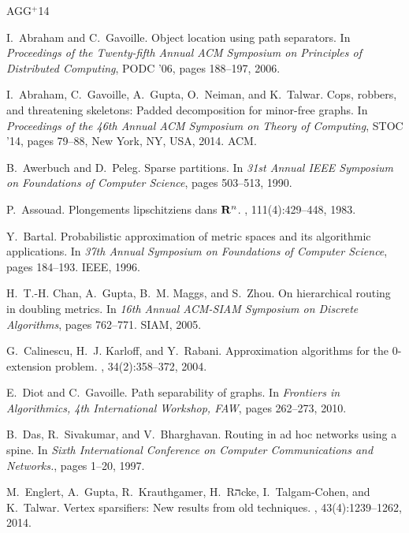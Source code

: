 \documentclass[11pt,fleqn]{article}
\begin{document}
\newcommand{\etalchar}[1]{$^{#1}$}
\begin{thebibliography}{AGG{\etalchar{+}}14}

I.~Abraham and C.~Gavoille.
\newblock Object location using path separators.
\newblock In {\em Proceedings of the Twenty-fifth Annual ACM Symposium on
  Principles of Distributed Computing}, PODC '06, pages 188--197, 2006.

\bibitem[AGG{\etalchar{+}}14]{AGGNT14}
I.~Abraham, C.~Gavoille, A.~Gupta, O.~Neiman, and K.~Talwar.
\newblock Cops, robbers, and threatening skeletons: Padded decomposition for
  minor-free graphs.
\newblock In {\em Proceedings of the 46th Annual ACM Symposium on Theory of
  Computing}, STOC '14, pages 79--88, New York, NY, USA, 2014. ACM.

B.~Awerbuch and D.~Peleg.
\newblock Sparse partitions.
\newblock In {\em 31st Annual IEEE Symposium on Foundations of Computer
  Science}, pages 503--513, 1990.

P.~Assouad.
\newblock Plongements lipschitziens dans {${\bf R}\sp{n}$}.
, 111(4):429--448, 1983.

Y.~Bartal.
\newblock Probabilistic approximation of metric spaces and its algorithmic
  applications.
\newblock In {\em 37th Annual Symposium on Foundations of Computer Science},
  pages 184--193. IEEE, 1996.

H.~T.-H. Chan, A.~Gupta, B.~M. Maggs, and S.~Zhou.
\newblock On hierarchical routing in doubling metrics.
\newblock In {\em 16th Annual ACM-SIAM Symposium on Discrete Algorithms}, pages
  762--771. SIAM, 2005.

G.~Calinescu, H.~J. Karloff, and Y.~Rabani.
\newblock Approximation algorithms for the 0-extension problem.
, 34(2):358--372, 2004.

E.~Diot and C.~Gavoille.
\newblock Path separability of graphs.
\newblock In {\em Frontiers in Algorithmics, 4th International Workshop,
  {FAW}}, pages 262--273, 2010.

B.~Das, R.~Sivakumar, and V.~Bharghavan.
\newblock Routing in ad hoc networks using a spine.
\newblock In {\em Sixth International Conference on Computer Communications and
  Networks.}, pages 1--20, 1997.

\bibitem[EGK{\etalchar{+}}14]{EGKRTT2010}
M.~Englert, A.~Gupta, R.~Krauthgamer, H.~Rהcke, I.~Talgam-Cohen, and
  K.~Talwar.
\newblock Vertex sparsifiers: New results from old techniques.
, 43(4):1239--1262, 2014.


\end{thebibliography}
\end{document}
